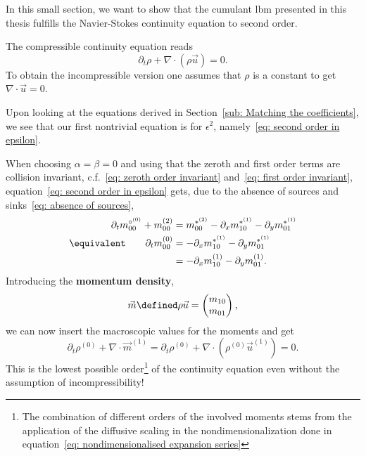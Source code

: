 In this small section, we want to show that the cumulant \gls{lbm} presented in this thesis fulfills the Navier-Stokes continuity equation to second order.

The compressible continuity equation reads
\begin{equation}
  \label{eq: continuity equation}
  \partial_t \rho + \nabla \cdot (\rho \vec{u}) = 0.
\end{equation}
To obtain the incompressible version one assumes that $\rho$ is a constant to get $\nabla\cdot\vec{u}=0$.

Upon looking at the equations derived in Section~\ref{sub: Matching the coefficients}, we see that our first nontrivial equation is for $\epsilon^2$, namely~\eqref{eq: second order in epsilon}.

When choosing $\alpha=\beta=0$ and using that the zeroth and first order terms are collision invariant, c.f.~\eqref{eq: zeroth order invariant} and~\eqref{eq: first order invariant}, equation~\eqref{eq: second order in epsilon} gets, due to the absence of sources and sinks~\eqref{eq: absence of sources},
\begin{align}
  \nonumber
  \partial_t m_{00}^{\circ^{(0)}} + m_{00}^{(2)} & =  m_{00}^{*^{(2)}} - \partial_x m_{10}^{*^{(1)}} - \partial_y m_{01}^{*^{(1)}}
   \\\equivalent \qquad
   \partial_t m_{00}^{(0)} & =  - \partial_x m_{10}^{*^{(1)}} - \partial_y m_{01}^{*^{(1)}} \nonumber
   \\
    & =  - \partial_x m_{10}^{(1)} - \partial_y m_{01}^{(1)}.
  \label{eq: continuity moments}
\end{align}
Introducing the \textbf{momentum density},
\begin{equation*}
  \vec{m} \defined \rho \vec{u} = \begin{pmatrix}m_{10} \\m_{01}  \end{pmatrix},
\end{equation*}
we can now insert the macroscopic values for the moments and get
\begin{equation}
  \partial_t \rho^{(0)} + \nabla \cdot \vec{m}^{(1)} =
  \partial_t \rho^{(0)} + \nabla \cdot (\rho^{(0)} \vec{u}^{(1)}) = 0.
\end{equation}
This is the lowest possible order\footnote{The combination of different orders of the involved moments stems from the application of the diffusive scaling in the nondimensionalization done in equation~\eqref{eq: nondimensionalised expansion series}} of the continuity equation even without the assumption of incompressibility!

